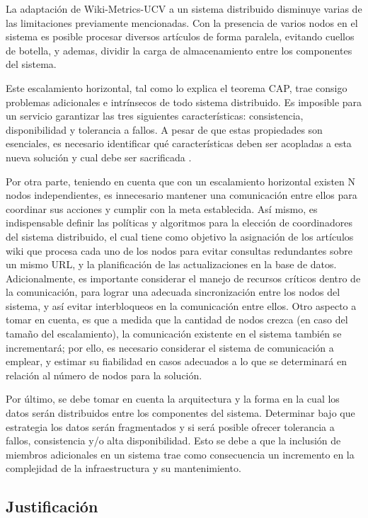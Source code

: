 La adaptación de Wiki-Metrics-UCV a un sistema distribuido disminuye varias de las limitaciones previamente
mencionadas. Con la presencia de varios nodos en el sistema es posible procesar diversos 
artículos de forma paralela, evitando cuellos de botella, y ademas, dividir la carga de almacenamiento 
entre los componentes del sistema.

Este escalamiento horizontal, tal como lo explica el teorema CAP, trae consigo problemas 
adicionales e  intrínsecos de todo sistema distribuido. Es imposible para un servicio garantizar las tres
siguientes características: consistencia, disponibilidad y tolerancia a fallos. A pesar de que estas 
propiedades son esenciales, es necesario identificar qué características deben ser acopladas a
esta nueva solución y cual debe ser sacrificada \cite{6}.

Por otra parte, teniendo en cuenta que con un escalamiento horizontal existen N
nodos independientes, es innecesario mantener una comunicación entre ellos para
coordinar sus acciones y cumplir con la meta establecida. Así mismo, es indispensable
definir las políticas y algoritmos para la elección de coordinadores del sistema
distribuido, el cual tiene como objetivo la asignación de los artículos wiki que procesa
cada uno de los nodos para evitar consultas redundantes sobre un mismo URL, y la
planificación de las actualizaciones en la base de datos. Adicionalmente, es importante
considerar el manejo de recursos críticos dentro de la comunicación, para lograr una
adecuada sincronización entre los nodos del sistema, y así evitar interbloqueos en la
comunicación entre ellos. Otro aspecto a tomar en cuenta, es que a medida que la
cantidad de nodos crezca (en caso del tamaño del escalamiento), la comunicación
existente en el sistema también se incrementará; por ello, es necesario considerar el
sistema de comunicación a emplear, y estimar su fiabilidad en casos adecuados a lo que
se determinará en relación al número de nodos para la solución.

Por último, se debe tomar en cuenta la arquitectura y la forma en la cual los datos
serán distribuidos entre los componentes del sistema. Determinar bajo que estrategia
los datos serán fragmentados y si será posible ofrecer tolerancia a fallos, consistencia y/o alta
disponibilidad. Esto se debe a que la inclusión de miembros adicionales en un sistema trae
como consecuencia un incremento en la complejidad de la infraestructura y su mantenimiento.

\subsection{Justificación}

